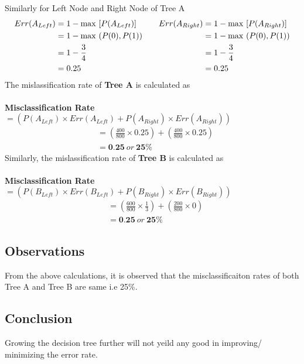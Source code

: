\documentclass[a4paper,11pt]{article}
\newcommand\tab[1][1cm]{\hspace*{#1}}
\begin{document}
\begin{mlsolution}
\noindent
\tab Similarly for  Left Node and Right Node of Tree A\\
\begin{equation*}
  \begin{split}
    Err(A_{Left}) &= 1 - \max\ [P(A_{Left})]\\
    &= 1 - \max\ (P(0), P(1))\\
    &= 1 - \frac{3}{4}\\
    &= 0.25
  \end{split}
\quad\linebreak\quad
  \begin{split}
    Err(A_{Right}) &= 1 - \max\ [P(A_{Right})]\\
    &= 1 - \max\ (P(0), P(1))\\
    &= 1 - \frac{3}{4}\\
    &= 0.25
  \end{split}
\end{equation*}
\noindent
\tab The mislassification rate of \textbf{Tree A} is calculated as\\
\\
\tab \textbf{Misclassification Rate} $= (P(A_{Left}) \times Err(A_{Left}) + P(A_{Right}) \times Err(A_{Right}))$
\begin{align*}
  &=(\frac{400}{800} \times 0.25) + (\frac{400}{800} \times 0.25)\\
  &= \textbf{0.25}\ or\ \textbf{25\%}
\end{align*}
\noindent
\tab Similarly, the mislassification rate of \textbf{Tree B} is calculated as\\
\\
\tab \textbf{Misclassification Rate} $= (P(B_{Left}) \times Err(B_{Left}) + P(B_{Right}) \times Err(B_{Right}))$
\begin{align*}
  &=(\frac{600}{800} \times \frac{1}{3}) + (\frac{200}{800} \times 0)\\
  &= \textbf{0.25}\ or\ \textbf{25\%}
\end{align*}
\subsection{Observations}
\tab From the above calculations, it is observed that the misclassificaiton rates of both Tree A and Tree B are same i.e 25\%.
\subsection{Conclusion}
\tab Growing the decision tree further will not yeild any good in improving/ minimizing the error rate.

\end{mlsolution}
\end{document}
